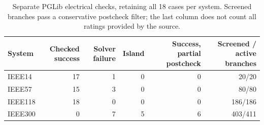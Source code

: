 \begin{table}[!t]
\centering\small
\caption{Separate PGLib electrical checks, retaining all 18 cases per system. Screened branches pass a conservative postcheck filter; the last column does not count all ratings provided by the source.}
\label{tab:physical_scope}
\begin{tabular}{lrrrrr}
\toprule
System & Checked success & Solver failure & Island & Success, partial postcheck & Screened / active branches\\
\midrule
IEEE14 & 17 & 1 & 0 & 0 & 20/20\\
IEEE57 & 15 & 3 & 0 & 0 & 80/80\\
IEEE118 & 18 & 0 & 0 & 0 & 186/186\\
IEEE300 & 0 & 7 & 5 & 6 & 403/411\\
\bottomrule
\end{tabular}
\end{table}
